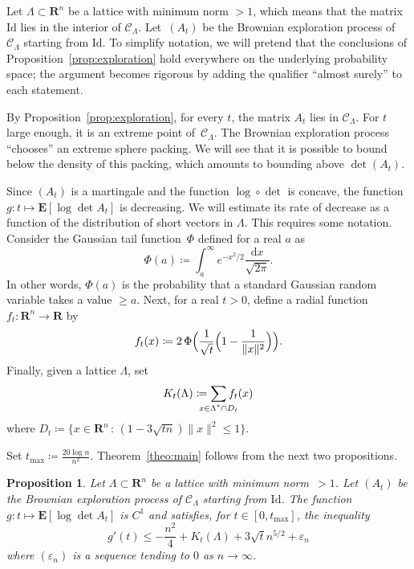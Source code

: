 \documentclass[10pt,a4paper]{amsart}
\newcommand{\R}{\mathbf{R}}
\newcommand{\E}{\mathbf{E}}
\newcommand{\e}{\varepsilon}
\newcommand{\iy}{\infty}
\newcommand{\Id}{\mathrm{Id}}
\renewcommand{\leq}{\leqslant}
\renewcommand{\geq}{\geqslant}
\newtheorem{proposition}{Proposition}
\begin{document}
Let $\Lambda \subset \R^n$ be a lattice with minimum norm $>1$, which means that the matrix~$\Id$ lies in the interior of $\mathscr{C}_\Lambda$. Let~$(A_t)$ be the Brownian exploration process of $\mathscr{C}_\Lambda$ starting from $\Id$. To simplify notation, we will pretend that the conclusions of Proposition~\ref{prop:exploration} hold everywhere on the underlying probability space; the argument becomes rigorous by adding the qualifier ``almost surely'' to each statement.
 
By Proposition~\ref{prop:exploration}, for every $t$, the matrix $A_t$ lies in $\mathscr{C}_\Lambda$. For $t$ large enough, it is an extreme point of~$\mathscr{C}_\Lambda$. The Brownian exploration process ``chooses'' an extreme sphere packing. We will see that it is possible to bound below the density of this packing, which amounts to bounding above $\det(A_t)$.
 
Since $(A_t)$ is a martingale and the function $\log \circ \det$ is concave, the function $g \colon t \mapsto \E [ \log \det A_t ]$ is decreasing. We will estimate its rate of decrease as a function of the distribution of short vectors in $\Lambda$. This requires some notation. Consider the Gaussian tail function~$\Phi$ defined for a real $a$ as
\[ \Phi(a) \coloneqq \int_a ^{\iy} e^{-x^2/2} \frac{\mathrm{d}x}{\sqrt{2\pi}} .\]
In other words, $\Phi(a)$ is the probability that a standard Gaussian random variable takes a value $\geq a$. Next, for a real $t > 0$, define a radial function $f_t \colon  \R^n \to \R$ by
\[ f_t(x) \coloneqq 2 \, \Phi \Bigl(\frac{1}{\sqrt{t}}\Bigl(1 - \frac{1}{\|x\|^2}\Bigr) \Bigr).  \]
Finally, given a lattice $\Lambda$, set
\[ K_t(\Lambda) \coloneqq \sum_{\mathclap{x \in \Lambda^* \cap D_t}}  f_t(x) \]
where $D_t \coloneqq \{ x \in \R^n \, : \, (1-3\sqrt{tn})\|x\|^2 \leq 1 \}$.
 
Set $t_{\max} \coloneqq \frac{20 \log n}{n^2}$. Theorem~\ref{theo:main} follows from the next two propositions.
 
\begin{proposition} \label{prop1}
Let $\Lambda \subset \R^n$ be a lattice with minimum norm~$>1$. Let $(A_t)$ be the Brownian exploration process of $\mathscr{C}_\Lambda$ starting from $\Id$. The function $g \colon  t \mapsto \E [\log \det A_t]$ is $C^1$ and satisfies, for $t \in [0,t_{\max}]$, the inequality
\[ g'(t) \leq  - \frac{n^2}{4} + K_t(\Lambda) + 3 \sqrt{t} n^{5/2} + \e_n \]
where $(\e_n)$ is a sequence tending to $0$ as $n \to \infty$.
\end{proposition}
 
\end{document}
